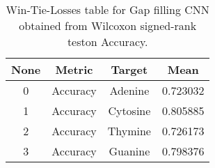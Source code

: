 \begin{table}[H]
\centering
\begin{tabular}{|c|c|c|c|}

 \textbf{None} & \textbf{Metric} & \textbf{Target} &  \textbf{Mean} \\
\hline

             0 &        Accuracy &         Adenine &       0.723032 \\
\hline
             1 &        Accuracy &        Cytosine &       0.805885 \\
\hline
             2 &        Accuracy &         Thymine &       0.726173 \\
\hline
             3 &        Accuracy &         Guanine &       0.798376 \\
\hline

\end{tabular}
\caption{Win-Tie-Losses table for Gap filling CNN obtained from Wilcoxon signed-rank teston Accuracy.}
\label{tab:gap_filling_cnn_nucleotides_means}
\end{table}